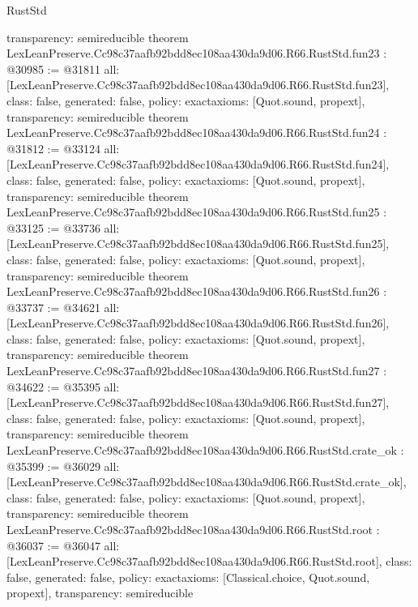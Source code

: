 \begin{lexlean}{RustStd}
\begin{coremodule}
{  transparency: semireducible
}
theorem LexLeanPreserve.Cc98c37aafb92bdd8ec108aa430da9d06.R66.RustStd.fun23 : @30985 := @31811 {
  all: [LexLeanPreserve.Cc98c37aafb92bdd8ec108aa430da9d06.R66.RustStd.fun23],
  class: false,
  generated: false,
  policy: exact{axioms: [Quot.sound, propext]},
  transparency: semireducible
}
theorem LexLeanPreserve.Cc98c37aafb92bdd8ec108aa430da9d06.R66.RustStd.fun24 : @31812 := @33124 {
  all: [LexLeanPreserve.Cc98c37aafb92bdd8ec108aa430da9d06.R66.RustStd.fun24],
  class: false,
  generated: false,
  policy: exact{axioms: [Quot.sound, propext]},
  transparency: semireducible
}
theorem LexLeanPreserve.Cc98c37aafb92bdd8ec108aa430da9d06.R66.RustStd.fun25 : @33125 := @33736 {
  all: [LexLeanPreserve.Cc98c37aafb92bdd8ec108aa430da9d06.R66.RustStd.fun25],
  class: false,
  generated: false,
  policy: exact{axioms: [Quot.sound, propext]},
  transparency: semireducible
}
theorem LexLeanPreserve.Cc98c37aafb92bdd8ec108aa430da9d06.R66.RustStd.fun26 : @33737 := @34621 {
  all: [LexLeanPreserve.Cc98c37aafb92bdd8ec108aa430da9d06.R66.RustStd.fun26],
  class: false,
  generated: false,
  policy: exact{axioms: [Quot.sound, propext]},
  transparency: semireducible
}
theorem LexLeanPreserve.Cc98c37aafb92bdd8ec108aa430da9d06.R66.RustStd.fun27 : @34622 := @35395 {
  all: [LexLeanPreserve.Cc98c37aafb92bdd8ec108aa430da9d06.R66.RustStd.fun27],
  class: false,
  generated: false,
  policy: exact{axioms: [Quot.sound, propext]},
  transparency: semireducible
}
theorem LexLeanPreserve.Cc98c37aafb92bdd8ec108aa430da9d06.R66.RustStd.crate_ok : @35399 := @36029 {
  all: [LexLeanPreserve.Cc98c37aafb92bdd8ec108aa430da9d06.R66.RustStd.crate_ok],
  class: false,
  generated: false,
  policy: exact{axioms: [Quot.sound, propext]},
  transparency: semireducible
}
theorem LexLeanPreserve.Cc98c37aafb92bdd8ec108aa430da9d06.R66.RustStd.root : @36037 := @36047 {
  all: [LexLeanPreserve.Cc98c37aafb92bdd8ec108aa430da9d06.R66.RustStd.root],
  class: false,
  generated: false,
  policy: exact{axioms: [Classical.choice, Quot.sound, propext]},
  transparency: semireducible
}


\end{coremodule}
\end{lexlean}
